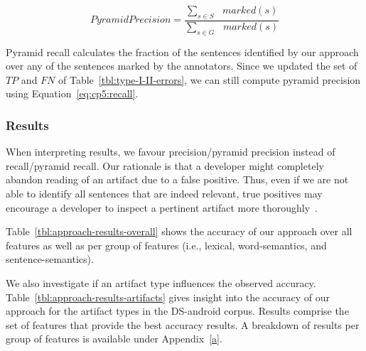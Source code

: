 \begin{equation}
\label{eq:cp5:pyramid-precision}    
    Pyramid Precision =  \frac{
        \sum_{s \in S} \text{ } marked(s)
    }{
        \sum_{s \in G} \text{ } marked(s)
    }
\end{equation}






\vspace{2mm}
Pyramid recall calculates the fraction of the sentences identified by our approach over 
any of the sentences marked by the annotators. Since we updated the set of $TP$ and $FN$ of Table~\ref{tbl:type-I-II-errors}, we can still compute pyramid precision using Equation~\ref{eq:cp5:recall}.




\subsubsection{Results}


When interpreting results, we favour precision/pyramid precision instead of recall/pyramid recall.
Our rationale is that a developer might completely abandon reading of an artifact due to a false positive.
Thus, even if we are not able to identify all sentences that are indeed relevant, true positives may encourage a developer to inspect a pertinent artifact more thoroughly~\cite{Singer1998, Brandt2009a}.




Table~\ref{tbl:approach-results-overall} shows the accuracy of our approach 
over all features as well as per group of features (i.e., lexical, word-semantics, and sentence-semantics).






We also investigate if an artifact type influences the observed accuracy. 
Table~\ref{tbl:approach-results-artifacts} gives insight into the accuracy of our approach for the artifact types in the \acs{DS-android} corpus. Results comprise the set of features 
that provide the best accuracy results. A breakdown of results per group of features is available under Appendix~\ref{a}.


